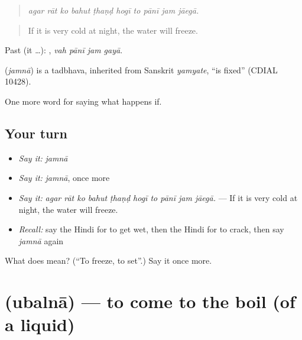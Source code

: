 \begin{quote}
         
\end{quote}

\begin{quote}
\emph{agar rāt ko bahut ṭhaṇḍ hogī to pānī jam jāegā.}
\end{quote}

\begin{quote}
If it is very cold at night, the water will freeze.
\end{quote}

Past (it …):    , \emph{vah pānī jam gayā}.

\begin{cousinweb}
\textbf{} (\emph{jamnā}) is a tadbhava, inherited from Sanskrit \emph{yamyate}, \textquotedblleft{}is fixed\textquotedblright{} (CDIAL 10428).
\end{cousinweb}

\begin{grammarlens}[title={What you've built}]
One more word for saying what happens if.
\end{grammarlens}

\subsection*{Your turn}
\begin{itemize}
\raggedright
  \item \emph{Say it:} \emph{jamnā}
  \item \emph{Say it:} \emph{jamnā}, once more
  \item \emph{Say it:} \emph{agar rāt ko bahut ṭhaṇḍ hogī to pānī jam jāegā.} — If it is very cold at night, the water will freeze.
  \item \emph{Recall:} say the Hindi for to get wet, then the Hindi for to crack, then say \emph{jamnā} again
\end{itemize}

\begin{tcolorbox}[breakable,colback=teal!4,colframe=teal!35!black,title={Before you move on}]
What does  mean? (\textquotedblleft{}To freeze, to set\textquotedblright{}.) Say it once more.
\end{tcolorbox}
\section[\texorpdfstring{\hi{उबलना} (ubalnā)}{उबलना (ubalnā)}]{ (ubalnā) — to come to the boil (of a liquid)}

